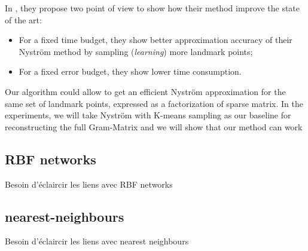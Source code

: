 \documentclass{article}
\begin{document}
In \cite{si2016computationally}, they propose two point of view to show how their method improve the state of the art:

\begin{itemize}
 \item For a fixed time budget, they show better approximation accuracy of their Nyström method by sampling (\textit{learning}) more landmark points;
 \item For a fixed error budget, they show lower time consumption.
\end{itemize}

Our algorithm could allow to get an efficient Nyström approximation for the same set of landmark points, expressed as a factorization of sparse matrix. In the experiments, we will take Nyström with K-means sampling as our baseline for reconstructing the full Gram-Matrix and we will show that our method can work

\subsection{RBF networks}

Besoin d'éclaircir les liens avec RBF networks

\subsection{nearest-neighbours}

Besoin d'éclaircir les liens avec nearest neighbours

%
%


\end{document}
